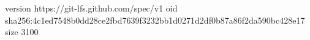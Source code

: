 version https://git-lfs.github.com/spec/v1
oid sha256:4c1ed7548b0dd28ce2fbd7639f3232bb1d0271d2df0b87a86f2da590bc428e17
size 3100

